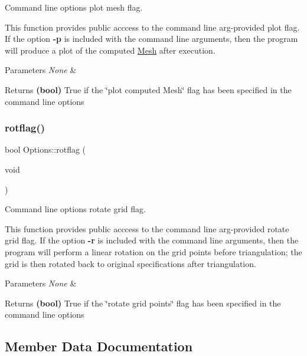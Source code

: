 Command line options plot mesh flag. 

This function provides public acccess to the command line arg-\/provided plot flag. If the option {\bfseries -\/p} is included with the command line arguments, then the program will produce a plot of the computed \mbox{\hyperlink{class_mesh}{Mesh}} after execution. 
\begin{DoxyParams}{Parameters}
{\em None} & \\
\hline
\end{DoxyParams}
\begin{DoxyReturn}{Returns}
{\bfseries (bool)} True if the \char`\"{}plot computed Mesh\char`\"{} flag has been specified in the command line options 
\end{DoxyReturn}
\mbox{\label{class_options_a896737c665d9c0ee7a17a0cdedf66bb7}} 
\subsubsection{\texorpdfstring{rotflag()}{rotflag()}}
{\footnotesize\ttfamily bool Options\+::rotflag (\begin{DoxyParamCaption}\item[{void}]{ }\end{DoxyParamCaption})\hspace{0.3cm}{\ttfamily [inline]}}



Command line options rotate grid flag. 

This function provides public acccess to the command line arg-\/provided rotate grid flag. If the option {\bfseries -\/r} is included with the command line arguments, then the program will perform a linear rotation on the grid points before triangulation; the grid is then rotated back to original specifications after triangulation. 
\begin{DoxyParams}{Parameters}
{\em None} & \\
\hline
\end{DoxyParams}
\begin{DoxyReturn}{Returns}
{\bfseries (bool)} True if the \char`\"{}rotate grid points\char`\"{} flag has been specified in the command line options 
\end{DoxyReturn}


\subsection{Member Data Documentation}
\mbox{\label{class_options_a762a0775c9b60ceb2737dc90c96f7c0b}} 
